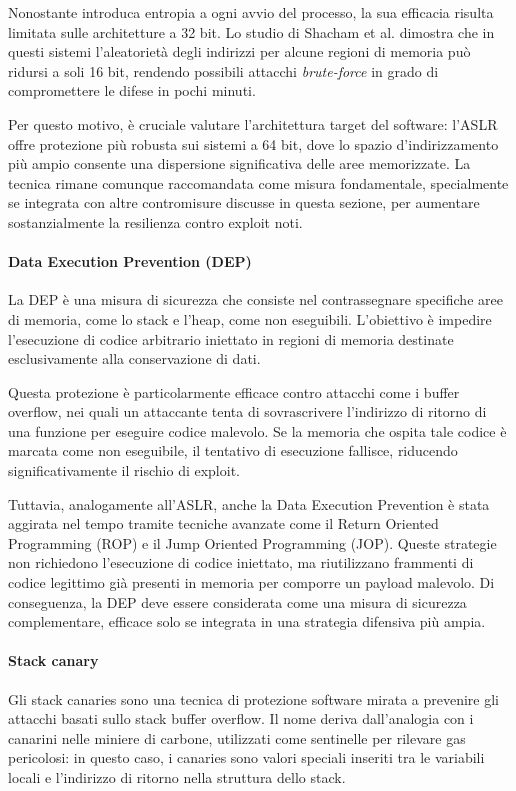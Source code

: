 Nonostante introduca entropia a ogni avvio del processo, la sua efficacia risulta
limitata sulle architetture a 32 bit. Lo studio di Shacham et al.\cite{aslr_effectiveness}
dimostra che in questi sistemi l'aleatorietà degli indirizzi per alcune regioni
di memoria può ridursi a soli 16 bit, rendendo possibili attacchi \textit{brute-force}
in grado di compromettere le difese in pochi minuti.

Per questo motivo, è cruciale valutare l'architettura target del software: l'ASLR
offre protezione più robusta sui sistemi a 64 bit, dove lo spazio d'indirizzamento
più ampio consente una dispersione significativa delle aree memorizzate. La
tecnica rimane comunque raccomandata come misura fondamentale, specialmente se integrata
con altre contromisure discusse in questa sezione, per aumentare sostanzialmente
la resilienza contro exploit noti.

\paragraph{Data Execution Prevention (DEP)}
La DEP è una misura di sicurezza che consiste nel contrassegnare specifiche aree
di memoria, come lo stack e l'heap, come non eseguibili. L'obiettivo è impedire
l'esecuzione di codice arbitrario iniettato in regioni di memoria destinate
esclusivamente alla conservazione di dati.

Questa protezione è particolarmente efficace contro attacchi come i buffer
overflow, nei quali un attaccante tenta di sovrascrivere l'indirizzo di ritorno di
una funzione per eseguire codice malevolo. Se la memoria che ospita tale codice
è marcata come non eseguibile, il tentativo di esecuzione fallisce, riducendo
significativamente il rischio di exploit.

Tuttavia, analogamente all'ASLR, anche la Data Execution Prevention è stata
aggirata nel tempo tramite tecniche avanzate come il Return Oriented Programming
(ROP) e il Jump Oriented Programming (JOP). Queste strategie non richiedono l'esecuzione
di codice iniettato, ma riutilizzano frammenti di codice legittimo già presenti
in memoria per comporre un payload malevolo. Di conseguenza, la DEP deve essere
considerata come una misura di sicurezza complementare, efficace solo se integrata
in una strategia difensiva più ampia.

\paragraph{Stack canary}
Gli stack canaries sono una tecnica di protezione software mirata a prevenire
gli attacchi basati sullo stack buffer overflow. Il nome deriva dall'analogia con
i canarini nelle miniere di carbone, utilizzati come sentinelle per rilevare gas
pericolosi: in questo caso, i canaries sono valori speciali inseriti tra le
variabili locali e l'indirizzo di ritorno nella struttura dello stack.

